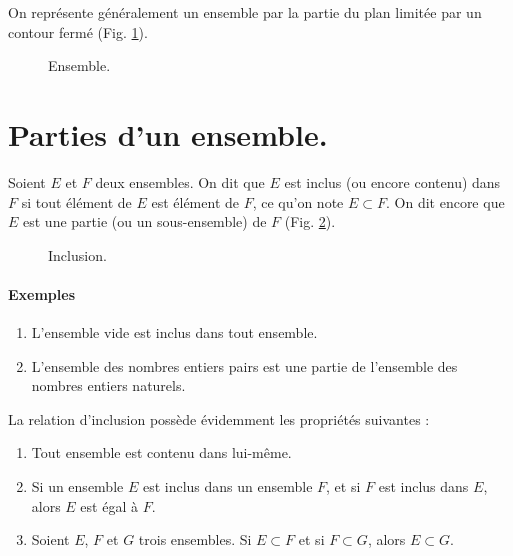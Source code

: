 \documentclass[12pt,parskip=full,chapterprefix=true,a5paper]{scrbook}
\begin{document}
On représente généralement un ensemble par la partie du plan limitée par un contour fermé (Fig. \ref{fig:ensemble}).

\begin{figure}[ht]
  \centering
  \caption{\label{fig:ensemble}Ensemble.}
\end{figure}

\section{Parties d'un ensemble.}

Soient \(E\) et \(F\) deux ensembles. On dit que \(E\) est inclus (ou encore contenu) dans \(F\) si tout élément de \(E\) est élément de \(F\), ce qu'on note \(E\subset F\). On dit encore que \(E\) est une partie (ou un sous-ensemble) de \(F\) (Fig. \ref{fig:inclusion}).

\begin{figure}[ht]
  \centering
  \caption{\label{fig:inclusion}Inclusion.}
\end{figure}

\paragraph{Exemples}
\begin{enumerate}
\item L'ensemble vide est inclus dans tout ensemble.
\item L'ensemble des nombres entiers pairs est une partie de l'ensemble des nombres entiers naturels.
\end{enumerate}

La relation d'inclusion possède évidemment les propriétés suivantes :
\begin{enumerate}[label=\alph*)]
\item Tout ensemble est contenu dans lui-même.
\item Si un ensemble \(E\) est inclus dans un ensemble \(F\), et si \(F\) est inclus dans \(E\), alors \(E\) est égal à \(F\).
\item Soient \(E\), \(F\) et \(G\) trois ensembles. Si \(E\subset F\) et si \(F\subset G\), alors \(E\subset G\).
\end{enumerate}
\end{document}
